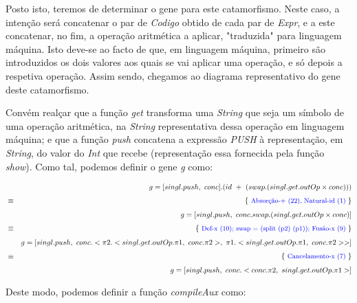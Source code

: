 \documentclass[a4paper]{article}
\begin{document}
\vspace{0.5cm}

Posto isto, teremos de determinar o gene para este catamorfismo. Neste caso, a intenção será concatenar o par de \textit{Codigo} obtido de cada par de \textit{Expr}, e a este concatenar, no fim, a operação aritmética a aplicar, "traduzida" para linguagem máquina. Isto deve-se ao facto de que, em linguagem máquina, primeiro são introduzidos os dois valores aos quais se vai aplicar uma operação, e só depois a respetiva operação. Assim sendo, chegamos ao diagrama representativo do gene deste catamorfismo.

\vspace{0.5cm}

\xymatrixcolsep{2pc}\xymatrixrowsep{2pc}
\centerline{}

\vspace{0.5cm}

Convém realçar que a função \textit{get} transforma uma \textit{String} que seja um símbolo de uma operação aritmética, na \textit{String} representativa dessa operação em linguagem máquina; e que a função \textit{push} concatena a expressão \textit{PUSH} à representação, em \textit{String}, do valor do \textit{Int} que recebe (representação essa fornecida pela função \textit{show}). Como tal, podemos definir o gene \textit{g} como: 

\vspace{0.5cm}

\begin{eqnarray*}
\start
  g = [singl.push,\ conc].(id\ +\ (swap.(singl.get.outOp \times conc)))
%
\just\equiv{\textcolor{blue}{Absorção-+ (22), Natural-id (1)}}
%
  g = [singl.push,\ conc.swap.(singl.get.outOp \times conc)]
%
\just\equiv{\textcolor{blue}{Def-x (10); swap = (split (p2) (p1)); Fusão-x (9)}}
%
  g = [singl.push,\ conc.<\pi2.<singl.get.outOp.\pi1,\ conc.\pi2>,\ \pi1.<singl.get.outOp.\pi1,\ conc.\pi2>>]
\just\equiv{\textcolor{blue}{Cancelamento-x (7)}}
%
  g = [singl.push,\ conc.<conc.\pi2,\ singl.get.outOp.\pi1>]
%
\end{eqnarray*}

\vspace{0.5cm}

Deste modo, podemos definir a função \textit{compileAux} como:
\end{document}
